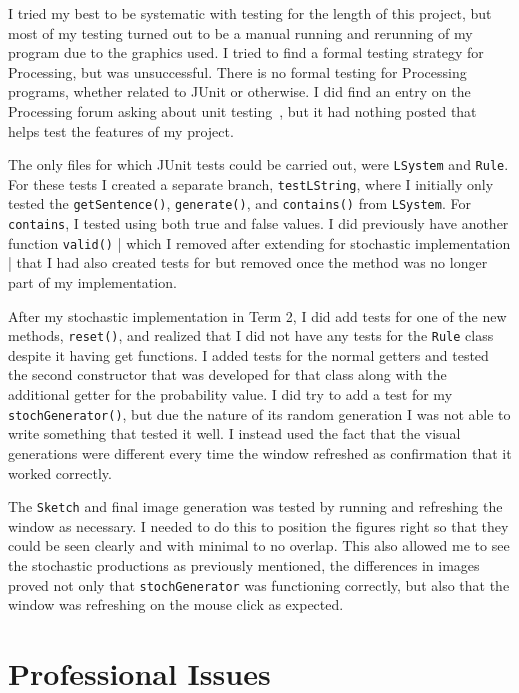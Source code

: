 \documentclass[]{final_report}
\begin{document}
I tried my best to be systematic with testing for the length of this project, but most of my testing turned out to be a manual running and rerunning of my program due to the graphics used. I tried to find a formal testing strategy for Processing, but was unsuccessful. There is no formal testing for Processing programs, whether related to JUnit or otherwise. I did find an entry on the Processing forum asking about unit testing~\cite{TEST}, but it had nothing posted that helps test the features of my project.

The only files for which JUnit tests could be carried out, were \verb|LSystem| and \verb|Rule|. For these tests I created a separate branch, \verb|testLString|, where I initially only tested the \verb|getSentence()|, \verb|generate()|, and \verb|contains()| from \verb|LSystem|. For \verb|contains|, I tested using both true and false values. I did previously have another function \verb|valid()| | which I removed after extending for stochastic implementation | that I had also created tests for but removed once the method was no longer part of my implementation.

After my stochastic implementation in Term 2, I did add tests for one of the new methods, \verb|reset()|, and realized that I did not have any tests for the \verb|Rule| class despite it having get functions. I added tests for the normal getters and tested the second constructor that was developed for that class along with the additional getter for the probability value. I did try to add a test for my \verb|stochGenerator()|, but due the nature of its random generation I was not able to write something that tested it well. I instead used the fact that the visual generations were different every time the window refreshed as confirmation that it worked correctly.

The \verb|Sketch| and final image generation was tested by running and refreshing the window as necessary. I needed to do this to position the figures right so that they could be seen clearly and with minimal to no overlap. This also allowed me to see the stochastic productions as previously mentioned, the differences in images proved not only that \verb|stochGenerator| was functioning correctly, but also that the window was refreshing on the mouse click as expected.

\chapter{Professional Issues}
\end{document}
